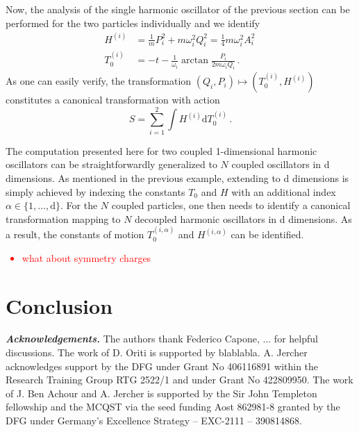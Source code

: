 \documentclass[twocolumn,notitlepage,superscriptaddress, nofootinbib,nobibnotes, aps,prd,10pt]{revtex4-1}%
\def\dd{\mathrm{d}}
\begin{document}
Now, the analysis of the single harmonic oscillator of the previous section can be performed for the two particles individually and we identify
%
\begin{subequations}
\begin{align}
H^{(i)} &= \frac{1}{m}P_i^2+m\omega_i^2Q_i^2 = \frac{1}{4}m\omega_i^2A_i^2\, \\[7pt]
T_0^{(i)} &= -t-\frac{1}{\omega_i}\arctan\frac{P_i}{2m\omega_iQ_i}\, .
\end{align}   
\end{subequations}
%
As one can easily verify, the transformation $(Q_i,P_i)\mapsto (T_0^{(i)},H^{(i)})$ constitutes a canonical transformation with action
%
\begin{equation}
S = \sum_{i=1}^2\int H^{(i)}\dd{T_0^{(i)}}\, .
\end{equation}
%

The computation presented here for two coupled 1-dimensional harmonic oscillators can be straightforwardly generalized to $N$ coupled oscillators in d dimensions. As mentioned in the previous example, extending to d dimensions is simply achieved by indexing the constants $T_0$ and $H$ with an additional index $\alpha\in\{1,\dots,\mathrm{d}\}$. For the $N$ coupled particles, one then needs to identify a canonical transformation mapping to $N$ decoupled harmonic oscillators in d dimensions. As a result, the constants of motion $T_0^{(i,\alpha)}$ and $H^{(i,\alpha)}$ can be identified.

\textcolor{red}{
\begin{itemize}
    \item what about symmetry charges
\end{itemize}
}


\section{Conclusion}

 \bigskip 

\noindent\textit{\textbf{Acknowledgements.}}
The authors thank Federico Capone, ... for helpful discussions. The work of D. Oriti is supported by blablabla. A. Jercher acknowledges support by the DFG under Grant No 406116891 within the Research Training Group RTG 2522/1 and under Grant No 422809950. The work of J. Ben Achour and A. Jercher is supported by the Sir John Templeton fellowship and the MCQST via the seed funding Aost 862981-8 granted by the DFG under Germany’s Excellence Strategy – EXC-2111 – 390814868.
\end{document}
